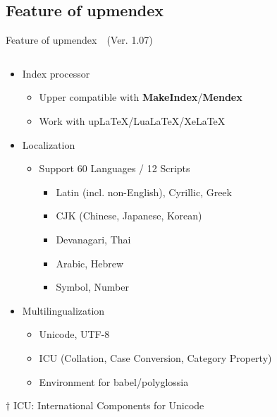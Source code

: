 \documentclass[aspectratio=169,10pt]{beamer}
\begin{document}
\subsection{Feature of upmendex}
\begin{frame}{Feature of upmendex~~{\scriptsize (Ver. 1.07)}}
\renewcommand{\thefootnote}{$\dagger$}
\begin{columns}
\begin{column}{120mm}
\begin{center}
  \begin{itemize}
  \item Index processor
    \begin{itemize}
    \item Upper compatible with \textbf{MakeIndex}/\textbf{Mendex}
    \item Work with upLaTeX/LuaLaTeX/XeLaTeX
    \end{itemize}
  \item Localization
    \begin{itemize}
    \item Support 60 Languages / 12 Scripts
      \begin{itemize}
      \item Latin (incl. non-English), Cyrillic, Greek
      \item CJK (Chinese, Japanese, Korean)
      \item Devanagari, Thai
      \item Arabic, Hebrew
      \item Symbol, Number
      \end{itemize}
    \end{itemize}
  \item Multilingualization
    \begin{itemize}
    \item Unicode, UTF-8
    \item ICU\footnotemark{} (Collation, Case Conversion, Category Property)
    \item Environment for babel/polyglossia
    \end{itemize}
  \end{itemize}
\end{center}
\vspace{2mm}
{\footnotesize $\dagger$ ICU: International Components for Unicode}
\end{column}
\end{columns}
\end{frame}
\end{document}
